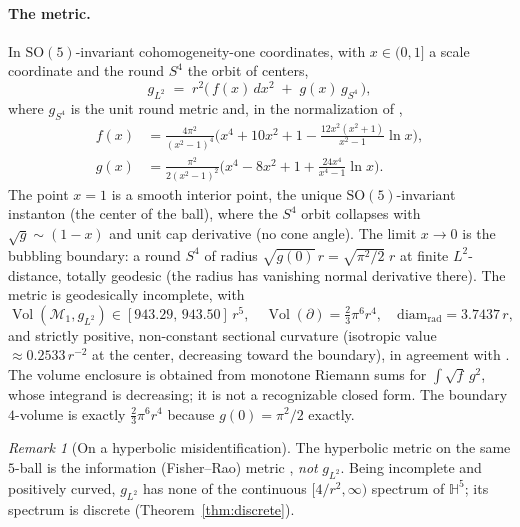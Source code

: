 \documentclass[11pt,letterpaper]{article}
\newcommand{\bbH}{\mathbb{H}}
\newcommand{\cM}{\mathcal{M}}
\newcommand{\SO}{\mathrm{SO}}
\DeclareMathOperator{\Vol}{Vol}
\theoremstyle{plain}
\theoremstyle{remark}
\newtheorem{remark}[theorem]{Remark}
\begin{document}
\paragraph{The metric.} In $\SO(5)$-invariant cohomogeneity-one coordinates, with $x\in(0,1]$ a scale coordinate and the round $S^4$ the orbit of centers,
\begin{equation}\label{eq:gp-metric}
  g_{L^2} \;=\; r^2\big(\, f(x)\,dx^2 \;+\; g(x)\, g_{S^4}\,\big),
\end{equation}
where $g_{S^4}$ is the unit round metric and, in the normalization of \cite{GP1987,DMM1987},
\begin{align}
  f(x) &= \frac{4\pi^2}{(x^2-1)^4}\Big(x^4+10x^2+1 - \tfrac{12x^2(x^2+1)}{x^2-1}\ln x\Big),\label{eq:f}\\
  g(x) &= \frac{\pi^2}{2(x^2-1)^2}\Big(x^4-8x^2+1 + \tfrac{24x^4}{x^4-1}\ln x\Big).\label{eq:g}
\end{align}
The point $x=1$ is a smooth interior point, the unique $\SO(5)$-invariant instanton (the center of the ball), where the $S^4$ orbit collapses with $\sqrt{g}\sim(1-x)$ and unit cap derivative (no cone angle). The limit $x\to0$ is the bubbling boundary: a round $S^4$ of radius $\sqrt{g(0)}\,r = \sqrt{\pi^2/2}\;r$ at finite $L^2$-distance, totally geodesic (the radius has vanishing normal derivative there). The metric is geodesically incomplete, with
\begin{equation}\label{eq:geom-constants}
  \Vol(\cM_1,g_{L^2}) \in [943.29,\,943.50]\,r^5,\quad
  \Vol(\partial) = \tfrac{2}{3}\pi^6 r^4,\quad
  \operatorname{diam_{rad}} = 3.7437\,r,
\end{equation}
and strictly positive, non-constant sectional curvature (isotropic value $\approx 0.2533\,r^{-2}$ at the center, decreasing toward the boundary), in agreement with \cite[Cor.~C]{GP1987}. The volume enclosure is obtained from monotone Riemann sums for $\int\sqrt f\,g^2$, whose integrand is decreasing; it is not a recognizable closed form. The boundary $4$-volume is exactly $\tfrac23\pi^6r^4$ because $g(0)=\pi^2/2$ exactly.

\begin{remark}[On a hyperbolic misidentification]\label{rmk:not-hyperbolic}
The hyperbolic metric on the same $5$-ball is the information (Fisher--Rao) metric \cite{Info}, \emph{not} $g_{L^2}$. Being incomplete and positively curved, $g_{L^2}$ has none of the continuous $[4/r^2,\infty)$ spectrum of $\bbH^5$; its spectrum is discrete (Theorem~\ref{thm:discrete}).
\end{remark}
\end{document}
